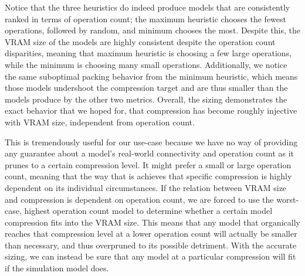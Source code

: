 Notice that the three heuristics do indeed
produce models that are consistently ranked in terms of operation count; the maximum heuristic chooses the fewest operations,
followed by random, and minimum chooses the most. Despite this, the VRAM size of the models are highly consistent despite
the operation count disparities, meaning that maximum heuristic is choosing a few large operations, while the minimum is
choosing many small operations. Additionally, we notice the same suboptimal packing behavior from the
minimum heuristic, which means those models undershoot the compression target and are thus smaller than the models
produce by the other two metrics. Overall, the sizing demonstrates the exact behavior that we hoped for,
that compression has become roughly injective with VRAM size, independent from operation count.

This is tremendously useful for our use-case because we have no way of providing any guarantee about a model's
real-world connectivity and operation count as it prunes to a certain compression level. It might prefer a small or large
operation count, meaning that the way that is achieves that specific compression is highly dependent on its individual
circumstances. If the relation between VRAM size and compression is dependent on operation count, we are forced to use the
worst-case, highest operation count model to determine whether a certain model compression fits into the VRAM size. This
means that any model that organically reaches that compression level at a lower operation count will actually be smaller
than necessary, and thus overpruned to its possible detriment. With the accurate sizing, we can instead be sure that any
model at a particular compression will fit if the simulation model does.